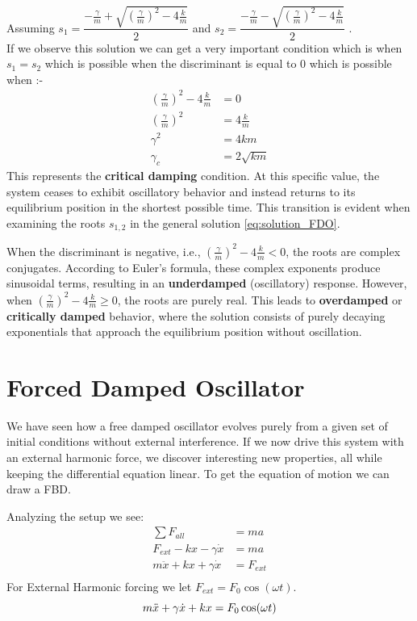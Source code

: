 \documentclass[10pt,twoside]{report}
\begin{document}
Assuming $s_1=\dfrac{-\frac{\gamma}{m}+\sqrt{\left(\frac{\gamma}{m} \right)^2-4\frac{k}{m}}}{2}$ and $s_2=\dfrac{-\frac{\gamma}{m}-\sqrt{\left(\frac{\gamma}{m} \right)^2-4\frac{k}{m}}}{2}$ .\\
If we observe this solution we can get a very important condition which is when $s_1=s_2$ which is possible when the discriminant is equal to $0$ which is possible when :-
\begin{align*}
    \left(\frac{\gamma}{m} \right)^2 - 4\frac{k}{m} &= 0 \\[8pt]
    \left(\frac{\gamma}{m} \right)^2 &= 4\frac{k}{m} \\[8pt]
    \gamma^2 &= 4km \\[8pt]
    \gamma_c &= 2\sqrt{km}
\end{align*}
This represents the \textbf{critical damping} condition. At this specific value, the system ceases to exhibit oscillatory behavior and instead returns to its equilibrium position in the shortest possible time. This transition is evident when examining the roots $s_{1,2}$ in the general solution \eqref{eq:solution_FDO}. 

When the discriminant is negative, i.e., $\left(\frac{\gamma}{m} \right)^2 - 4\frac{k}{m} < 0$, the roots are complex conjugates. According to Euler's formula, these complex exponents produce sinusoidal terms, resulting in an \textbf{underdamped} (oscillatory) response. However, when $\left(\frac{\gamma}{m} \right)^2 - 4\frac{k}{m} \geq 0$, the roots are purely real. This leads to \textbf{overdamped} or \textbf{critically damped} behavior, where the solution consists of purely decaying exponentials that approach the equilibrium position without oscillation.



\section{Forced Damped Oscillator}
We have seen how a free damped oscillator evolves purely from a given set of initial conditions without external interference. If we now drive this system with an external harmonic force, we discover interesting new properties, all while keeping the differential equation linear. To get the equation of motion we can draw a FBD. %

Analyzing the setup we see:
\begin{align*}
    \sum F_{all} &= ma\\[8pt]
    F_{ext}-kx-\gamma\dot{x} &= ma\\[8pt]
    m\ddot{x} + kx+\gamma\dot{x} &= F_{ext}\\[8pt]
\end{align*}
For External Harmonic forcing we let $F_{ext} = F_0\cos(\omega t)$. %
\begin{equation}
\label{equation of Harmonic forced oscillator}
     m\ddot{x} +\gamma\dot{x} + kx =  F_0\cos(\omega t)\\[8pt]
\end{equation}
\end{document}
